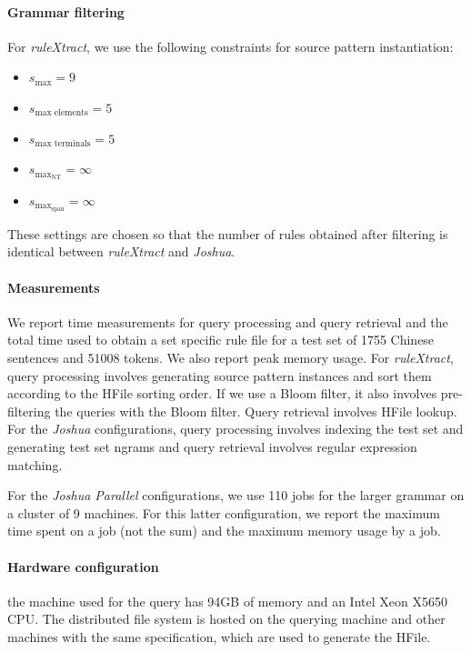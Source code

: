 \paragraph{Grammar filtering} For \emph{ruleXtract}, we use the following constraints for
    source pattern instantiation: 
    \begin{itemize}
      \item $ s_{\text{max}} = 9$
      \item $s_{\text{max elements}} = 5$
      \item $s_{\text{max terminals}} = 5$ %
      \item $s_{\text{max}_{\text{NT}}} = \infty$
      \item $s_{\text{max}_{\text{span}}} = \infty$ %
    \end{itemize}
    These settings are chosen so that the number of rules obtained after filtering is identical between
    \emph{ruleXtract} and \emph{Joshua}.
%
\paragraph{Measurements} We report time measurements for query processing and query
    retrieval and the total time used to obtain a set specific rule file for a
    test set of 1755 Chinese sentences and 51008 tokens. We also report peak
    memory usage. For \emph{ruleXtract}, query processing involves generating
    source pattern instances and sort them according to the HFile sorting order.
    If we use a Bloom filter, it also involves pre-filtering the queries with
    the Bloom filter. Query retrieval involves HFile lookup. For the
    \emph{Joshua} configurations, query processing involves indexing the test
    set and generating test set ngrams and query retrieval involves regular
    expression matching.

    For the \emph{Joshua Parallel}
    configurations, we use 110 jobs for the larger grammar on a cluster of 9
    machines. For this latter configuration, we report the maximum time spent on
    a job (not the sum) and the maximum memory usage by a job.
%
\paragraph{Hardware configuration} the machine used for the query has 94GB of
    memory and an Intel Xeon X5650 CPU. The distributed file system is hosted on
    the querying machine and other machines with the same specification, which
    are used to generate the HFile.

